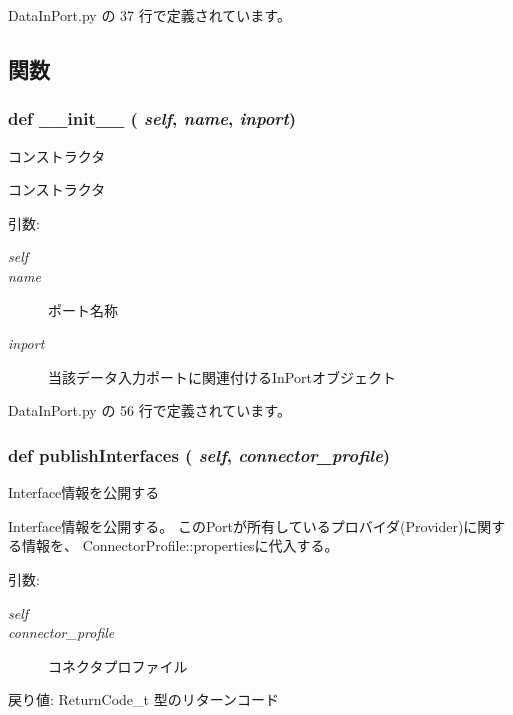  DataInPort.py の 37 行で定義されています。

\subsection{関数}
\subsubsection{\setlength{\rightskip}{0pt plus 5cm}def \_\-\_\-init\_\-\_\- ( {\em self},  {\em name},  {\em inport})}\label{classsource__py_1_1_data_in_port_1_1_data_in_port_c775ee34451fdfa742b318538164070e}


コンストラクタ 

コンストラクタ

\begin{Desc}
\item[引数:]
\begin{description}
\item[{\em self}]\item[{\em name}]ポート名称 \item[{\em inport}]当該データ入力ポートに関連付けるInPortオブジェクト \end{description}
\end{Desc}


 DataInPort.py の 56 行で定義されています。
\subsubsection{\setlength{\rightskip}{0pt plus 5cm}def publishInterfaces ( {\em self},  {\em connector\_\-profile})}\label{classsource__py_1_1_data_in_port_1_1_data_in_port_cc531607a3c2f8b651a97eb335152647}


Interface情報を公開する 

Interface情報を公開する。 このPortが所有しているプロバイダ(Provider)に関する情報を、 ConnectorProfile::propertiesに代入する。

\begin{Desc}
\item[引数:]
\begin{description}
\item[{\em self}]\item[{\em connector\_\-profile}]コネクタプロファイル\end{description}
\end{Desc}
\begin{Desc}
\item[戻り値:]ReturnCode\_\-t 型のリターンコード \end{Desc}


